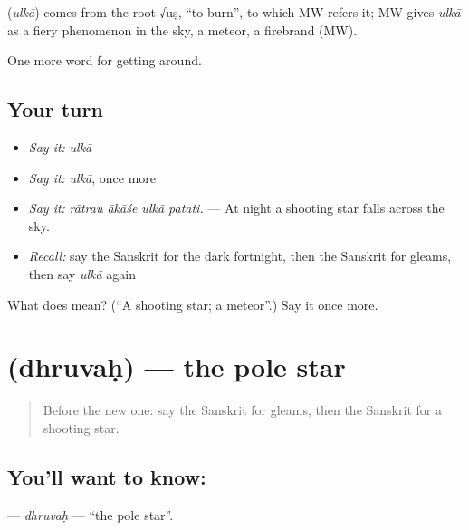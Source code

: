 \begin{cousinweb}
\textbf{} (\emph{ulkā}) comes from the root √uṣ, \textquotedblleft{}to burn\textquotedblright{}, to which MW refers it; MW gives \emph{ulkā} as a fiery phenomenon in the sky, a meteor, a firebrand (MW).
\end{cousinweb}

\begin{grammarlens}[title={What you've built}]
One more word for getting around.
\end{grammarlens}

\subsection*{Your turn}
\begin{itemize}
\raggedright
  \item \emph{Say it:} \emph{ulkā}
  \item \emph{Say it:} \emph{ulkā}, once more
  \item \emph{Say it:} \emph{rātrau ākāśe ulkā patati.} — At night a shooting star falls across the sky.
  \item \emph{Recall:} say the Sanskrit for the dark fortnight, then the Sanskrit for gleams, then say \emph{ulkā} again
\end{itemize}

\begin{tcolorbox}[breakable,colback=teal!4,colframe=teal!35!black,title={Before you move on}]
What does  mean? (\textquotedblleft{}A shooting star; a meteor\textquotedblright{}.) Say it once more.
\end{tcolorbox}
\section[\texorpdfstring{\sk{ध्रुवः} (dhruvaḥ)}{ध्रुवः (dhruvaḥ)}]{ (dhruvaḥ) — the pole star}

\label{lesson:SA-C445-dhruvah}



\begin{quote}
Before the new one: say the Sanskrit for gleams, then the Sanskrit for a shooting star.
\end{quote}

\subsection*{You'll want to know: }
\textbf{} — \emph{dhruvaḥ} — \textquotedblleft{}the pole star\textquotedblright{}.

